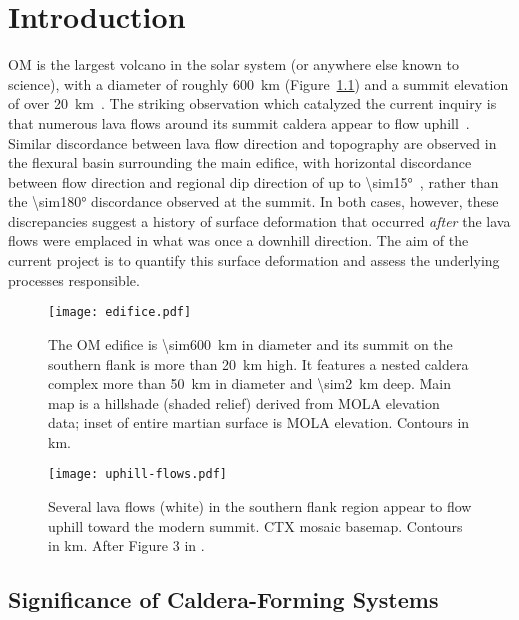 \chapter{Introduction}
\ac{OM} is the largest volcano in the solar system (or anywhere else known to science), with a diameter of roughly \qty{600}{\km} (Figure~\ref{fig:edifice}) and a summit elevation of over \qty{20}{\km}~\parencite{plescia_morphometric_2004}. The striking observation which catalyzed the current inquiry is that numerous lava flows around its summit caldera appear to flow uphill~\parencite[Figure~\ref{fig:uphill-flows}; after][]{mouginis-mark_late-stage_2019}. Similar discordance between lava flow direction and topography are observed in the flexural basin surrounding the main edifice, with horizontal discordance between flow direction and regional dip direction of up to \ang{\sim15}~\parencite{chadwick_late_2015}, rather than the \ang{\sim180} discordance observed at the summit. In both cases, however, these discrepancies suggest a history of surface deformation that occurred \textit{after} the lava flows were emplaced in what was once a downhill direction. The aim of the current project is to quantify this surface deformation and assess the underlying processes responsible.

\begin{figure}
    \centering
    \texttt{[image: edifice.pdf]}
    \caption[\acl{OM}]{The \ac{OM} edifice is \qty{\sim600}{\km} in diameter and its summit on the southern flank is more than \qty{20}{\km} high. It features a nested caldera complex more than \qty{50}{\km} in diameter and \qty{\sim2}{\km} deep. Main map is a hillshade (shaded relief) derived from \acs{MOLA} elevation data; inset of entire martian surface is \acs{MOLA} elevation. Contours in \unit{\km}.}\label{fig:edifice}
\end{figure}

\begin{figure}
    \centering
    \texttt{[image: uphill-flows.pdf]}
    \caption[Uphill lava flows]{Several lava flows (white) in the southern flank region appear to flow uphill toward the modern summit. \acs{CTX} mosaic basemap. Contours in \unit{\km}. After Figure 3 in \textcite{mouginis-mark_late-stage_2019}.}%
    \label{fig:uphill-flows}
\end{figure}

\section{Significance of Caldera-Forming Systems}

